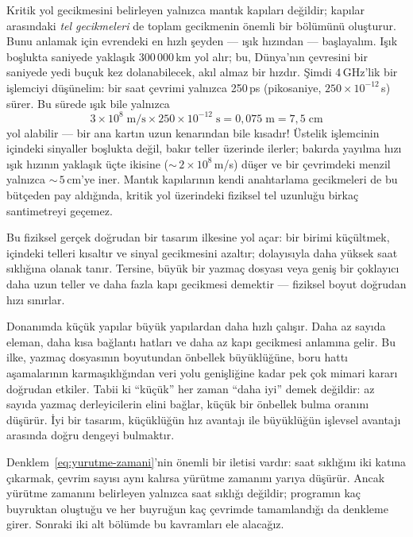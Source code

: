 Kritik yol gecikmesini belirleyen yalnızca mantık kapıları değildir; kapılar arasındaki \emph{tel gecikmeleri} de toplam gecikmenin önemli bir bölümünü oluşturur. Bunu anlamak için evrendeki en hızlı şeyden --- ışık hızından --- başlayalım. Işık boşlukta saniyede yaklaşık 300\,000\,km yol alır; bu, Dünya'nın çevresini bir saniyede yedi buçuk kez dolanabilecek, akıl almaz bir hızdır. Şimdi 4\,GHz'lik bir işlemciyi düşünelim: bir saat çevrimi yalnızca 250\,ps (pikosaniye, $250 \times 10^{-12}$\,s) sürer. Bu sürede ışık bile yalnızca
%
\[
3 \times 10^{8}\;\text{m/s} \times 250 \times 10^{-12}\;\text{s} = 0{,}075\;\text{m} = 7{,}5\;\text{cm}
\]
%
yol alabilir --- bir ana kartın uzun kenarından bile kısadır! Üstelik işlemcinin içindeki sinyaller boşlukta değil, bakır teller üzerinde ilerler; bakırda yayılma hızı ışık hızının yaklaşık üçte ikisine (${\sim}\,2 \times 10^{8}$\,m/s) düşer ve bir çevrimdeki menzil yalnızca ${\sim}\,5$\,cm'ye iner. Mantık kapılarının kendi anahtarlama gecikmeleri de bu bütçeden pay aldığında, kritik yol üzerindeki fiziksel tel uzunluğu birkaç santimetreyi geçemez.

Bu fiziksel gerçek doğrudan bir tasarım ilkesine yol açar: bir birimi küçültmek, içindeki telleri kısaltır ve sinyal gecikmesini azaltır; dolayısıyla daha yüksek saat sıklığına olanak tanır. Tersine, büyük bir yazmaç dosyası veya geniş bir çoklayıcı daha uzun teller ve daha fazla kapı gecikmesi demektir --- fiziksel boyut doğrudan hızı sınırlar.

\begin{tanim}
Donanımda küçük yapılar büyük yapılardan daha hızlı çalışır. Daha az sayıda eleman, daha kısa bağlantı hatları ve daha az kapı gecikmesi anlamına gelir. Bu ilke, yazmaç dosyasının boyutundan önbellek büyüklüğüne, boru hattı aşamalarının karmaşıklığından veri yolu genişliğine kadar pek çok mimari kararı doğrudan etkiler. Tabii ki ``küçük'' her zaman ``daha iyi'' demek değildir: az sayıda yazmaç derleyicilerin elini bağlar, küçük bir önbellek bulma oranını düşürür. İyi bir tasarım, küçüklüğün hız avantajı ile büyüklüğün işlevsel avantajı arasında doğru dengeyi bulmaktır.
\end{tanim}

Denklem~\ref{eq:yurutme-zamani}'nin önemli bir iletisi vardır: saat sıklığını iki katına çıkarmak, çevrim sayısı aynı kalırsa yürütme zamanını yarıya düşürür. Ancak yürütme zamanını belirleyen yalnızca saat sıklığı değildir; programın kaç buyruktan oluştuğu ve her buyruğun kaç çevrimde tamamlandığı da denkleme girer. Sonraki iki alt bölümde bu kavramları ele alacağız.


